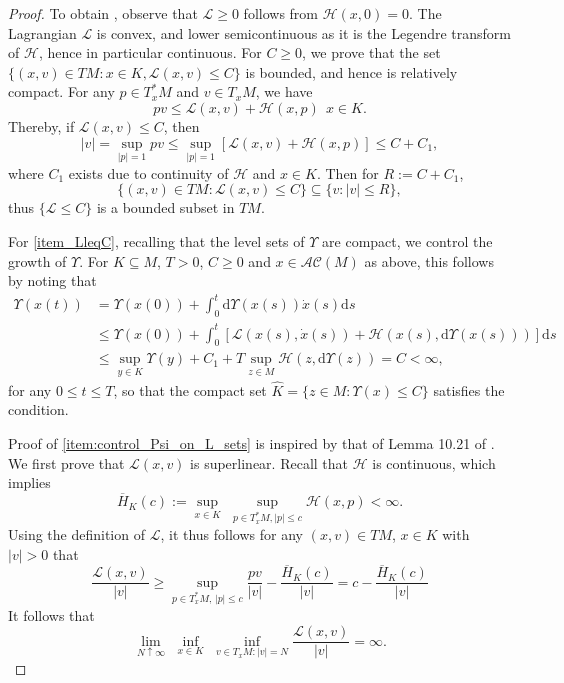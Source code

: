 \documentclass[a4paper]{article}
\newcommand{\cH}{\mathcal{H}}
\newcommand{\cL}{\mathcal{L}}
\numberwithin{equation}{section}
\theoremstyle{definition}
\begin{document}
\begin{proof}
	To obtain , observe that $\mathcal{L}\geq 0$ follows from $\mathcal{H}(x,0)=0$. The Lagrangian $\mathcal{L}$ is convex, and lower semicontinuous as it is the Legendre transform of $\mathcal{H}$, hence in particular continuous. For $C\geq 0$, we prove that the set $\{(x,v)\in TM :x\in K, \mathcal{L}(x,v)\leq C\}$ is bounded, and hence is relatively
	compact. For any $p \in T^*_xM$ and $v\in T_xM$, we have 
	\begin{equation*}
		p v \leq \mathcal{L}(x,v) + \mathcal{H}(x,p)~~x\in K. 
	\end{equation*} Thereby, if
	$\mathcal{L}(x,v) \leq C$, then \begin{equation*}
		|v| = \sup \limits_{|p|=1}
		p  v \leq  \sup\limits_{|p|=1}
		[\mathcal{L}(x,v) + \mathcal{H}(x,p)] \leq C + C_1,    
	\end{equation*} where
	$C_1$ exists due to continuity of $\mathcal{H}$ and $x\in K$. Then for $R := C + C_1$,
	\begin{equation*}
		\{(x,v)\in TM: \mathcal{L}(x,v)\leq C\} \subseteq \{v :
		|v| \leq R\},
	\end{equation*}
	thus $\{\mathcal{L} \leq C\}$ is a bounded subset in $TM$.
	\par
	For \cref{item_LleqC}, recalling that the level sets of $\Upsilon$ are compact, we control the growth of $\Upsilon$. For $K\subseteq M$, $T>0$, $C\geq 0$ and $x\in \mathcal{AC}(M)$ as above, this follows by noting that 
	\begin{align*} \Upsilon(x(t))&=\Upsilon(x(0))+\int^t_0\mathrm{d} \Upsilon(x(s))\dot{x}(s)\mathrm{d}s\\
		&\leq\Upsilon(x(0))+\int^t_0\left[\mathcal{L}(x(s),\dot{x}(s))+\mathcal{H}(x(s),\mathrm{d} \Upsilon(x(s)))\right]\mathrm{d}s\\
		&\leq \sup_{y\in K}\Upsilon(y)+C_1+T\sup_{z\in M}\mathcal{H}(z,\mathrm{d}\Upsilon(z))=C<\infty,
	\end{align*}
	for any $0\leq t \leq T$, so that the compact set $\hat{K}=\{z\in M:\Upsilon(x)\leq C\}$ satisfies the condition.
	\par
 Proof of \ref{item:control_Psi_on_L_sets} is inspired by that of Lemma 10.21 of \cite{FK2006}. We first prove that $\mathcal{L}(x,v)$ is superlinear. Recall that $\mathcal{H}$ is continuous, which implies
    \begin{equation*}
        \overline{H}_K(c) := \sup_{x \in K} \, \, \sup_{p \in T_x^*M, |p| \leq c} \cH(x,p) < \infty.
    \end{equation*}
    Using the definition of $\cL$, it thus follows for any $(x,v) \in TM$, $x \in K$ with $|v| > 0$ that
    \begin{equation*}
        \frac{\cL(x,v)}{|v|} \geq \sup_{p \in T_x^*M, \, |p| \leq c} \frac{pv}{|v|} - \frac{\overline{H}_K(c)}{|v|} = c - \frac{\overline{H}_K(c)}{|v|}
    \end{equation*}
    It follows that
    \begin{equation*}
        \lim_{N \uparrow \infty} \, \,   \inf_{x \in K} \, \,  \inf_{v \in T_xM: |v| = N} \frac{\cL(x,v)}{|v|} = \infty.
    \end{equation*}


\end{proof}
\end{document}
